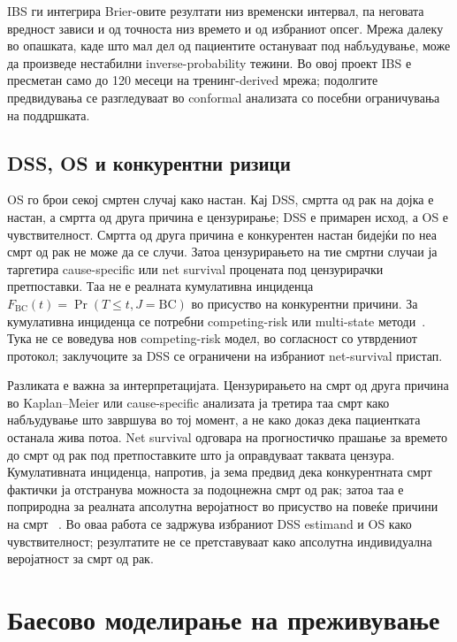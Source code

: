 \documentclass[12pt]{article}
\begin{document}
IBS ги интегрира Brier-овите резултати низ временски интервал, па неговата
вредност зависи и од точноста низ времето и од избраниот опсег. Мрежа далеку
во опашката, каде што мал дел од пациентите остануваат под набљудување, може
да произведе нестабилни inverse-probability тежини. Во овој проект IBS е
пресметан само до 120 месеци на тренинг-derived мрежа; подолгите предвидувања
се разгледуваат во conformal анализата со посебни ограничувања на поддршката.

\subsection{DSS, OS и конкурентни ризици}
\label{sec:dss-os-competing}

OS го брои секој смртен случај како настан. Кај DSS, смртта од рак на дојка е
настан, а смртта од друга причина е цензурирање; DSS е примарен исход, а OS е
чувствителност. Смртта од друга причина е конкурентен настан бидејќи по неа
смрт од рак не може да се случи. Затоа цензурирањето на тие смртни случаи ја
таргетира cause-specific или net survival процената под цензурирачки
претпоставки. Таа не е реалната кумулативна инциденца
$F_{\mathrm{BC}}(t)=\Pr(T\leq t,J=\mathrm{BC})$ во присуство на конкурентни
причини. За кумулативна инциденца се потребни competing-risk или multi-state
методи~\cite{putter2007,austin2016}. Тука не се воведува нов competing-risk
модел, во согласност со утврдениот протокол; заклучоците за DSS се ограничени
на избраниот net-survival пристап.

Разликата е важна за интерпретацијата. Цензурирањето на смрт од друга причина
во Kaplan--Meier или cause-specific анализата ја третира таа смрт како
набљудување што завршува во тој момент, а не како доказ дека пациентката
останала жива потоа. Net survival одговара на прогностичко прашање за времето
до смрт од рак под претпоставките што ја оправдуваат таквата цензура.
Кумулативната инциденца, напротив, ја зема предвид дека конкурентната смрт
фактички ја отстранува можноста за подоцнежна смрт од рак; затоа таа е поприродна
за реалната апсолутна веројатност во присуство на повеќе причини на смрт
~\cite{putter2007}. Во оваа работа се задржува избраниот DSS estimand и OS
како чувствителност; резултатите не се претставуваат како апсолутна индивидуална
веројатност за смрт од рак.

\section{Баесово моделирање на преживување}
\end{document}
